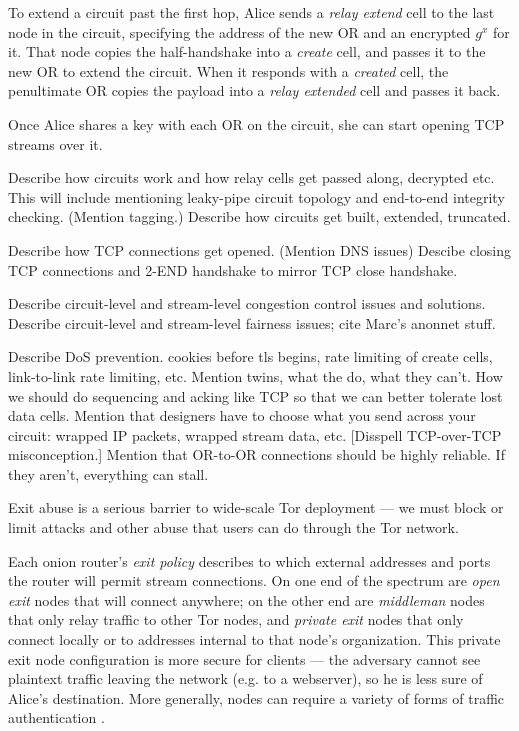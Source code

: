 \documentclass[times,10pt,twocolumn]{article}
\begin{document}
To extend a circuit past the first hop, Alice sends a \emph{relay extend}
cell to the last node in the circuit, specifying the address of the new
OR and an encrypted $g^x$ for it. That node copies the half-handshake
into a \emph{create} cell, and passes it to the new OR to extend the
circuit. When it responds with a \emph{created} cell, the penultimate OR
copies the payload into a \emph{relay extended} cell and passes it back.

Once Alice shares a key with each OR on the circuit, she can
start opening TCP streams over it. 

Describe how circuits work and how relay cells get passed along,
decrypted etc.  This will include mentioning leaky-pipe circuit
topology and end-to-end integrity checking.  (Mention tagging.)
Describe how circuits get built, extended, truncated.

\label{subsec:tcp}

Describe how TCP connections get opened.  (Mention DNS issues)
Descibe closing TCP connections and 2-END handshake to mirror TCP
close handshake.

\label{subsec:congestion}

Describe circuit-level and stream-level
congestion control issues and solutions.
Describe circuit-level and stream-level fairness issues; cite Marc's
anonnet stuff.



Describe DoS prevention. cookies before tls begins, rate limiting of
create cells, link-to-link rate limiting, etc.
Mention twins, what the do, what they can't.
How we should do sequencing and acking like TCP so that we can better
tolerate lost data cells.
Mention that designers have to choose what you send across your
  circuit: wrapped IP packets, wrapped stream data, etc.  [Disspell
  TCP-over-TCP misconception.]
Mention that OR-to-OR connections should be highly reliable.  If
  they aren't, everything can stall.

\label{subsec:exitpolicies}

Exit abuse is a serious barrier to wide-scale Tor deployment --- we
must block or limit attacks and other abuse that users can do through
the Tor network.

Each onion router's \emph{exit policy} describes to which external
addresses and ports the router will permit stream connections. On one end
of the spectrum are \emph{open exit} nodes that will connect anywhere;
on the other end are \emph{middleman} nodes that only relay traffic to
other Tor nodes, and \emph{private exit} nodes that only connect locally
or to addresses internal to that node's organization. This private exit
node configuration is more secure for clients --- the adversary cannot
see plaintext traffic leaving the network (e.g. to a webserver), so he
is less sure of Alice's destination. More generally, nodes can require
a variety of forms of traffic authentication \cite{onion-discex00}.
\end{document}
